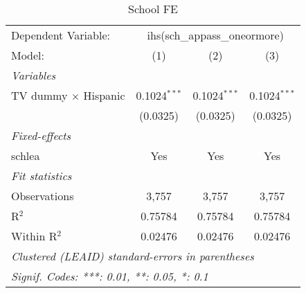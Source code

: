 \begin{table}[htbp]
\centering
\caption{School FE}
\begin{tabular}{lccc}
\tabularnewline\midrule\midrule
Dependent Variable:&\multicolumn{3}{c}{ihs(sch\_appass\_oneormore)}\\
Model:&(1) & (2) & (3)\\
\midrule \emph{Variables}&   &   &  \\
TV dummy $\times$ Hispanic & 0.1024$^{***}$ & 0.1024$^{***}$ & 0.1024$^{***}$\\
  &(0.0325) & (0.0325) & (0.0325)\\
\midrule \emph{Fixed-effects}&   &   &  \\
schlea & Yes & Yes & Yes\\
\midrule \emph{Fit statistics}&  & & \\
Observations & 3,757&3,757&3,757\\
R$^2$ & 0.75784&0.75784&0.75784\\
Within R$^2$ & 0.02476&0.02476&0.02476\\
\midrule\midrule\multicolumn{4}{l}{\emph{Clustered (LEAID) standard-errors in parentheses}}\\
\multicolumn{4}{l}{\emph{Signif. Codes: ***: 0.01, **: 0.05, *: 0.1}}\\
\end{tabular}
\end{table}

